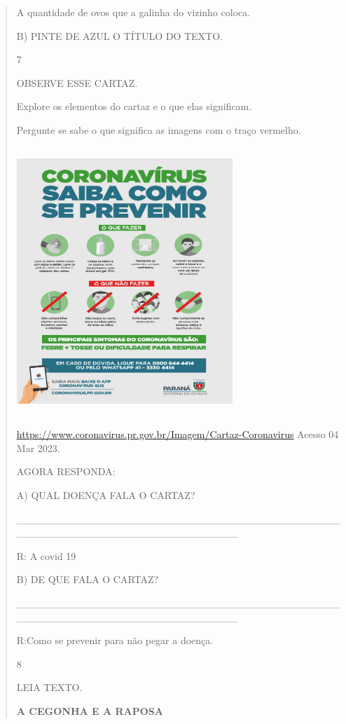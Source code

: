 {{{{\begin{verse}
{{\begin{escolha}
{{{{A quantidade de ovos que a galinha do vizinho coloca.

B) PINTE DE AZUL O TÍTULO DO TEXTO.

\num{7}

OBSERVE ESSE CARTAZ.

Explore os elementos do cartaz e o que elas significam.

Pergunte se sabe o que significa as imagens com o traço vermelho.

\includegraphics[width=3.20896in,height=3.98057in]{media/image120.jpeg}

\url{https://www.coronavirus.pr.gov.br/Imagem/Cartaz-Coronavirus} Acesso
04 Mar 2023.

AGORA RESPONDA:

A) QUAL DOENÇA FALA O CARTAZ?

\_\_\_\_\_\_\_\_\_\_\_\_\_\_\_\_\_\_\_\_\_\_\_\_\_\_\_\_\_\_\_\_\_\_\_\_\_\_\_\_\_\_\_\_\_\_\_\_\_\_\_\_\_\_\_\_\_\_\_\_\_\_\_\_\_\_\_\_\_\_\_\_\_\_

R: A covid 19

B) DE QUE FALA O CARTAZ?

\_\_\_\_\_\_\_\_\_\_\_\_\_\_\_\_\_\_\_\_\_\_\_\_\_\_\_\_\_\_\_\_\_\_\_\_\_\_\_\_\_\_\_\_\_\_\_\_\_\_\_\_\_\_\_\_\_\_\_\_\_\_\_\_\_\_\_\_\_\_\_\_\_\_

R:Como se prevenir para não pegar a doença.

\num{8}

LEIA TEXTO.

\textbf{A CEGONHA E A RAPOSA}

}}}}
\end{escolha}}}
\end{verse}}}}}
